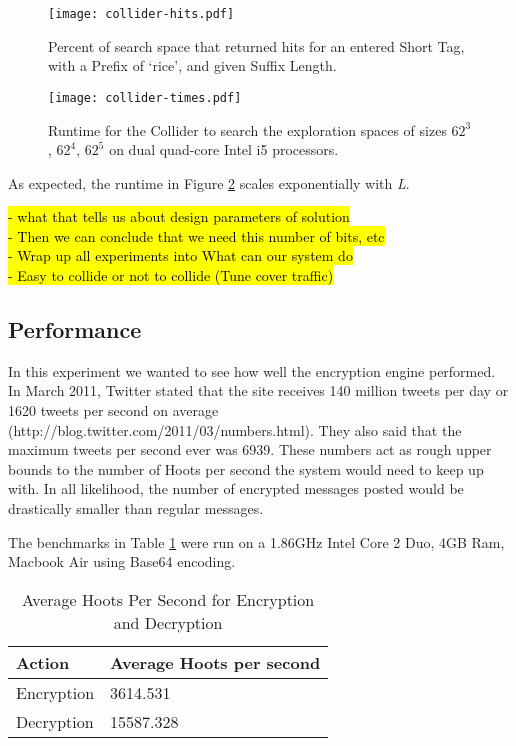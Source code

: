 \begin{figure}
\begin{center}
\texttt{[image: collider-hits.pdf]}
\caption{Percent of search space that returned hits for an entered Short Tag, with a Prefix of `rice', and given Suffix Length.
\label{fig:collider-hits}
}
\end{center}
\end{figure}

\begin{figure}
\begin{center}
\texttt{[image: collider-times.pdf]}
\caption{Runtime for the Collider to search the exploration spaces of sizes $62^3$, $62^4$, $62^5$ on dual quad-core Intel i5 processors.
\label{fig:collider-times}
}
\end{center}
\end{figure}


As expected, the runtime in Figure \ref{fig:collider-times} scales exponentially with \textit{L}. 


\hl{
- what that tells us about design parameters of solution \\
- Then we can conclude that we need this number of bits, etc\\
- Wrap up all experiments into What can our system do\\
- Easy to collide or not to collide (Tune cover traffic)\\
}

\subsection{Performance}

In this experiment we wanted to see how well the encryption engine performed. In March 2011, Twitter stated that the site receives 140 million tweets per day or 1620 tweets per second on average (http://blog.twitter.com/2011/03/numbers.html). They also said that the maximum tweets per second ever was 6939. These numbers act as rough upper bounds to the number of Hoots per second the system would need to keep up with. In all likelihood, the number of encrypted messages posted would be drastically smaller than regular messages.

The benchmarks in Table \ref{tab:hps} were run on a 1.86GHz Intel Core 2 Duo, 4GB Ram, Macbook Air using Base64 encoding.


\begin{table}
\caption{Average Hoots Per Second for Encryption and Decryption
\label{tab:hps}
}
\begin{center}
    \begin{tabular}{ l  l }
	\hline
	Action & Average Hoots per second \\ \hline
	Encryption & 3614.531 \\
	Decryption & 15587.328 \\ \hline
    \end{tabular}
\end{center}
\end{table}


